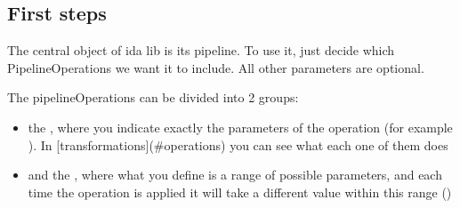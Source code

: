 \documentclass[letterpaper,10pt,english]{sphinxmanual}
\begin{document}
\subsection{First steps}
\label{\detokenize{overview:first-steps}}
The central object of ida lib is its pipeline. To use it, just decide which PipelineOperations we want it to include. All other parameters are optional.

\begin{sphinxVerbatim}[commandchars=\\\{\}]
  
                      
                       
                      
                      \PYG{p}{[}   \PYG{p}{]}
                       
\end{sphinxVerbatim}

The pipelineOperations can be divided into 2 groups:
\begin{itemize}
\item {} 
the , where you indicate exactly the parameters of the operation (for example  ). In {[}transformations{]}(\#operations) you can see what each one of them does

\item {} 
and the , where what you define is a range of possible parameters, and each time the operation is applied it will take a different value within this range ()

\end{itemize}
\end{document}
